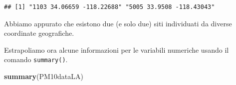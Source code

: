 \documentclass[]{book}
\newenvironment{Shaded}{\begin{snugshade}}{\end{snugshade}}
\newcommand{\KeywordTok}[1]{\textcolor[rgb]{0.13,0.29,0.53}{\textbf{#1}}}
\newcommand{\NormalTok}[1]{#1}
\newcommand{\OperatorTok}[1]{\textcolor[rgb]{0.81,0.36,0.00}{\textbf{#1}}}
\begin{document}
\begin{Shaded}
\end{Shaded}

\begin{verbatim}
## [1] "1103 34.06659 -118.22688" "5005 33.9508 -118.43043"
\end{verbatim}

Abbiamo appurato che esistono due (e solo due) siti individuati da diverse coordinate geografiche.

Estrapoliamo ora alcune informazioni per le variabili numeriche usando il comando \texttt{summary()}.

\begin{Shaded}
\begin{Highlighting}[]
\KeywordTok{summary}\NormalTok{(PM10dataLA)}
\end{Highlighting}
\end{Shaded}
\end{document}
